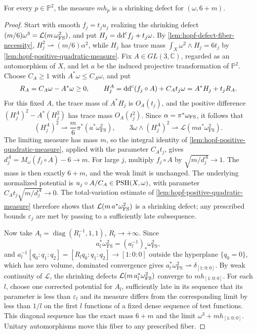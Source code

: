 \begin{lemma}\label{lem:hopf-fiber-defect-realization}
For every $p\in\mathbb P^2$, the measure $mh_p$ is a shrinking defect for $(\omega,6+m)$.
\end{lemma}
\begin{proof}
Start with smooth $f_j=t_ju_j$ realizing the shrinking defect $(m/6)\omega^3=\mathcal L(m\,\omega_{\mathrm{FS}}^2)$, and put $H_j=\mathrm{dd}^{\mathrm{c}} f_j+t_j\omega$. By \cref{lem:hopf-defect-fiber-necessity}, $H_j^2\rightharpoonup(m/6)\alpha^2$, while $H_j$ has trace mass $\int_X\omega^2\wedge H_j=6t_j$ by \cref{lem:hopf-positive-quadratic-measure}. Fix $A\in GL(3,\mathbb C)$, regarded as an automorphism of $X$, and let $a$ be the induced projective transformation of $\mathbb P^2$. Choose $C_A\geq1$ with $A^*\omega\leq C_A\omega$, and put
\[
 R_A=C_A\omega-A^*\omega\geq0,\qquad
 H_j^A=\mathrm{dd}^{\mathrm{c}}(f_j\circ A)+C_At_j\omega=A^*H_j+t_jR_A.
\]
For this fixed $A$, the trace mass of $A^*H_j$ is $O_A(t_j)$, and the positive difference $(H_j^A)^2-A^*(H_j^2)$ has trace mass $O_A(t_j^2)$. Since $\alpha=\pi^*\omega_{\mathrm{FS}}$, it follows that
\[
 (H_j^A)^2\rightharpoonup\frac m6\pi^*(a^*\omega_{\mathrm{FS}}^2),
 \qquad 3\omega\wedge(H_j^A)^2\rightharpoonup\mathcal L(m a^*\omega_{\mathrm{FS}}^2).
\]
The limiting measure has mass $m$, so the integral identity of \cref{lem:hopf-positive-quadratic-measure}, applied with the parameter $C_At_j$, gives $d_j^A=M_\omega(f_j\circ A)-6\to m$. For large $j$, multiply $f_j\circ A$ by $\sqrt{m/d_j^A}\to1$. The mass is then exactly $6+m$, and the weak limit is unchanged. The underlying normalized potential is $u_j\circ A/C_A\in\mathrm{PSH}(X,\omega)$, with parameter $C_At_j\sqrt{m/d_j^A}\to0$. The total-variation estimate of \cref{lem:hopf-positive-quadratic-measure} therefore shows that $\mathcal L(m\,a^*\omega_{\mathrm{FS}}^2)$ is a shrinking defect; any prescribed bounds $\varepsilon_j$ are met by passing to a sufficiently late subsequence.

Now take $A_l=\operatorname{diag}(R_l^{-1},1,1)$, $R_l\to+\infty$. Since
\[
 a_l^*\omega_{\mathrm{FS}}^2=(a_l^{-1})_*\omega_{\mathrm{FS}}^2,
\]
and $a_l^{-1}[q_0:q_1:q_2]=[R_lq_0:q_1:q_2]\to[1:0:0]$ outside the hyperplane $\{q_0=0\}$, which has zero volume, dominated convergence gives $a_l^*\omega_{\mathrm{FS}}^2\rightharpoonup\delta_{[1:0:0]}$. By weak continuity of $\mathcal L$, the shrinking defects $\mathcal L(m\,a_l^*\omega_{\mathrm{FS}}^2)$ converge to $mh_{[1:0:0]}$. For each $l$, choose one corrected potential for $A_l$, sufficiently late in its sequence that its parameter is less than $\varepsilon_l$ and its measure differs from the corresponding limit by less than $1/l$ on the first $l$ functions of a fixed dense sequence of test functions. This diagonal sequence has the exact mass $6+m$ and the limit $\omega^3+mh_{[1:0:0]}$. Unitary automorphisms move this fiber to any prescribed fiber.
\end{proof}


